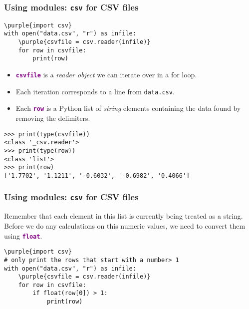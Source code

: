 \documentclass[xcolor=svgnames]{beamer}
\newcommand{\purple}[1]{{\textcolor{purple}{#1}}}
\newcommand{\nl}{\\[1em]}
\newcommand{\command}[1]{\texttt{\textbf{\textcolor{DarkMagenta}{#1}}}}
\newcommand{\ft}[1]{\frametitle{#1}}
\begin{document}
\begin{frame}[fragile]\ft{Using modules: {\tt csv} for CSV files}
\begin{Verbatim}[xleftmargin=.1in,commandchars=\\\{\}, frame=single]
\purple{import csv}
with open("data.csv", "r") as infile:
	\purple{csvfile = csv.reader(infile)}
	for row in csvfile:
		print(row)
\end{Verbatim}
\begin{itemize}
\item \command{csvfile} is a \emph{reader object} we can iterate over in a for loop.
\item Each iteration corresponds to a line from {\tt data.csv}.  
\item Each \command{row} is a Python list of \emph{string} elements containing the data found by removing the delimiters.
\end{itemize}

\begin{Verbatim}[frame=single, fontsize=\small]
>>> print(type(csvfile))
<class '_csv.reader'>
>>> print(type(row))
<class 'list'>
>>> print(row)
['1.7702', '1.1211', '-0.6032', '-0.6982', '0.4066']
\end{Verbatim}
\end{frame}


\begin{frame}[fragile]\ft{Using modules: {\tt csv} for CSV files}
Remember that each element in this list is currently being treated as a string.  Before we do any calculations on this numeric values, we need to convert them using \command{float}.\nl

\begin{Verbatim}[xleftmargin=.1in,commandchars=\\\{\}, frame=single]
\purple{import csv}
# only print the rows that start with a number> 1 
with open("data.csv", "r") as infile:
	\purple{csvfile = csv.reader(infile)}
	for row in csvfile:
		if float(row[0]) > 1:
			print(row)
\end{Verbatim}
\end{frame}







\end{document}
